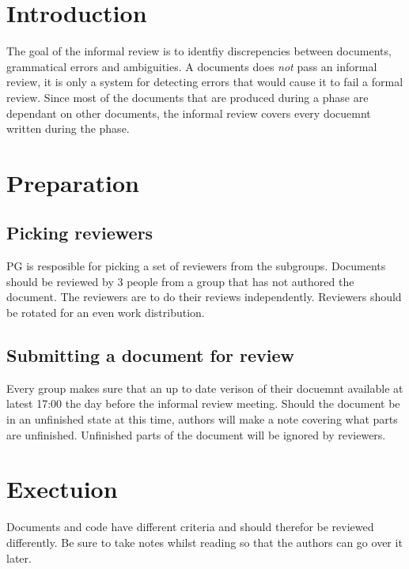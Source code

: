 \documentclass{article}
\date {#1}
\title {
        \documentNumber {10}    
    
    \documentVersion {0.1}
    
    \documentTitle {Informal Review Protocol}
    \documentGroup {2}
    
    \documentResponsible {Project management group}
    \documentAuthors {Project management group}
    
    \documentDate {2021-01-31}
}
\begin{document}
\maketitle
\thispagestyle{empty}

\newpage

\tableofcontents

\newpage


\section{Introduction}
    The goal of the informal review is to identfiy discrepencies between documents, grammatical errors and ambiguities. A documents does \emph{not} pass an informal review, it is only a system for detecting errors that would cause it to fail a formal review.  
    Since most of the documents that are produced during a phase are dependant on other documents, the informal review covers every docuemnt written during the phase.

\section{Preparation}
    \subsection{Picking reviewers}
        PG is resposible for picking a set of reviewers from the subgroups. Documents should be reviewed by 3 people from a group that has not authored the document. The reviewers are to do their reviews independently. Reviewers should be rotated for an even work distribution.

    \subsection{Submitting a document for review}
        Every group makes sure that an up to date verison of their docuemnt
        available at latest 17:00 the day before the informal review meeting. Should the document be in an unfinished state at this time, authors will make a note covering what parts are unfinished. Unfinished parts of the document will be ignored by reviewers. 

\newpage
\section{Exectuion}
    Documents and code have different criteria and should therefor be reviewed differently. Be sure to take notes whilst reading so that the authors can go over it later. 
    
\end{document}
